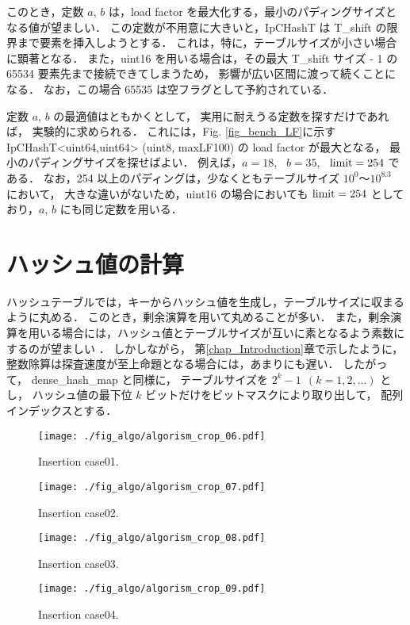 このとき，定数 $a$, $b$ は，load factor を最大化する，最小のパディングサイズとなる値が望ましい．
この定数が不用意に大きいと，IpCHashT は T\_shift の限界まで要素を挿入しようとする．
これは，特に，テーブルサイズが小さい場合に顕著となる．
また，uint16 を用いる場合は，その最大 T\_shift サイズ - 1 の 65534 要素先まで接続できてしまうため，
影響が広い区間に渡って続くことになる．
なお，この場合 65535 は空フラグとして予約されている．

定数 $a$, $b$ の最適値はともかくとして，
実用に耐えうる定数を探すだけであれば，
実験的に求められる．
これには，Fig. \ref{fig_bench_LF}に示す IpCHashT<uint64,uint64> (uint8, maxLF100) の load factor が最大となる，
最小のパディングサイズを探せばよい．
例えば，$a=18$, \ $b=35$, \ ${\rm limit}=254$ である．
なお，254 以上のパディングは，少なくともテーブルサイズ $10^0〜10^{8.3}$ において，
大きな違いがないため，uint16 の場合においても ${\rm limit}=254$ としており，$a$, $b$ にも同じ定数を用いる．


\section{ハッシュ値の計算}

ハッシュテーブルでは，キーからハッシュ値を生成し，テーブルサイズに収まるように丸める．
このとき，剰余演算を用いて丸めることが多い．
また，剰余演算を用いる場合には，ハッシュ値とテーブルサイズが互いに素となるよう素数にするのが望ましい \citep{石畑1989}．
しかしながら，
第\ref{chap_Introduction}章で示したように，
整数除算は探査速度が至上命題となる場合には，あまりにも遅い．
したがって，
dense\_hash\_map と同様に，
テーブルサイズを $2^k-1\ \ (k=1,2,...)$ とし，
ハッシュ値の最下位 $k$ ビットだけをビットマスクにより取り出して，
配列インデックスとする．


\begin{figure}[h]
  \texttt{[image: ./fig\_algo/algorism\_crop\_06.pdf]}
  \caption{ Insertion case01. }
  \label{fig_IpCHashT_insert_hard_case01}

  \texttt{[image: ./fig\_algo/algorism\_crop\_07.pdf]}
  \caption{ Insertion case02. }
  \label{fig_IpCHashT_insert_hard_case02}

  \texttt{[image: ./fig\_algo/algorism\_crop\_08.pdf]}
  \caption{ Insertion case03. }
  \label{fig_IpCHashT_insert_hard_case03}

  \texttt{[image: ./fig\_algo/algorism\_crop\_09.pdf]}
  \caption{ Insertion case04. }
  \label{fig_IpCHashT_insert_hard_case04}
\end{figure}


